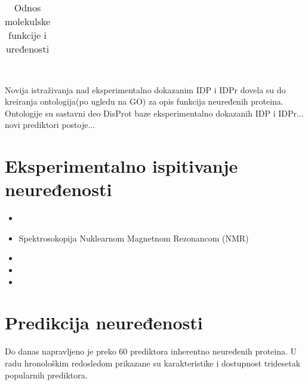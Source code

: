 \begin{table}[h!]
  \centering
  \caption{Odnos molekulske funkcije i uređenosti}
  \label{tab:funkcija_uvod}
  \begin{tabular}{c}
  
  \end{tabular}
\end{table}


 \\
Novija istraživanja nad eksperimentalno dokazanim IDP i IDPr dovela su do
kreiranja ontologija(po ugledu na GO\parencite{GO2000}) za opis funkcija
neuređenih proteina. Ontologije su sastavni deo DisProt\parencite{disprot7}
baze eksperimentalno dokazanih IDP i IDPr... novi prediktori postoje...

\section{Eksperimentalno ispitivanje neuređenosti}

\begin{itemize}
  \item {} 
  \item Spektrosokopija Nuklearnom Magnetnom Rezonancom (NMR) 
  \item {}
  \item {}
  \item {}
\end{itemize}


\section{Predikcija neuređenosti}

Do danas napravljeno je preko 60 prediktora inherentno neuređenih
proteina\parencite{meng2017}. U radu\parencite{meng_c2017} hronološkim
redosledom prikazane su karakteristike i dostupnost tridesetak popularnih
prediktora.


